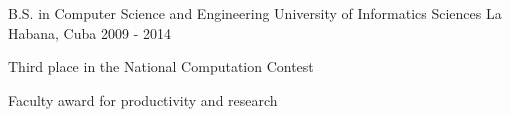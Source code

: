 


\begin{cventries}


\cventry
{B.S. in Computer Science and Engineering} %
{University of Informatics Sciences} %
{La Habana, Cuba} %
{2009 - 2014} %
{ %
\begin{cvitems}
\item {Third place in the National Computation Contest}
\item {Faculty award for productivity and research}
\end{cvitems}
}

\end{cventries}